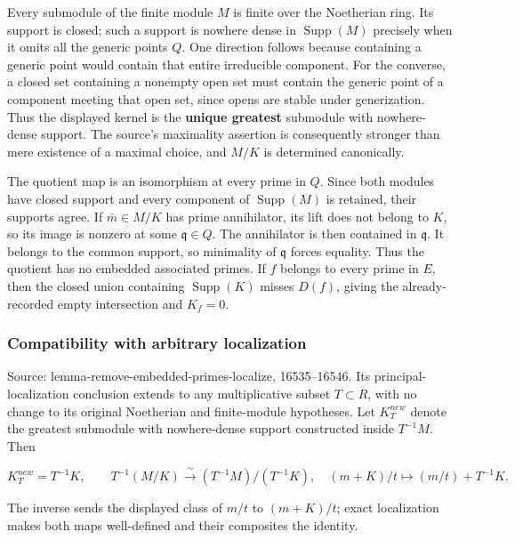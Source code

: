 Every submodule of the finite module \(M\) is finite over the Noetherian ring. Its support is closed; such a support is nowhere dense in \(\operatorname{Supp}(M)\) precisely when it omits all the generic points \(Q\). One direction follows because containing a generic point would contain that entire irreducible component. For the converse, a closed set containing a nonempty open set must contain the generic point of a component meeting that open set, since opens are stable under generization. Thus the displayed kernel is the \textbf{unique greatest} submodule with nowhere-dense support. The source's maximality assertion is consequently stronger than mere existence of a maximal choice, and \(M/K\) is determined canonically.

The quotient map is an isomorphism at every prime in \(Q\). Since both modules have closed support and every component of \(\operatorname{Supp}(M)\) is retained, their supports agree. If \(\bar m\in M/K\) has prime annihilator, its lift does not belong to \(K\), so its image is nonzero at some \(\mathfrak q\in Q\). The annihilator is then contained in \(\mathfrak q\). It belongs to the common support, so minimality of \(\mathfrak q\) forces equality. Thus the quotient has no embedded associated primes. If \(f\) belongs to every prime in \(E\), then the closed union containing \(\operatorname{Supp}(K)\) misses \(D(f)\), giving the already-recorded empty intersection and \(K_f=0\).

\subsubsection{Compatibility with arbitrary localization}\label{compatibility-with-arbitrary-localization}

Source: lemma-remove-embedded-primes-localize, 16535--16546. Its principal-localization conclusion extends to any multiplicative subset \(T\subset R\), with no change to its original Noetherian and finite-module hypotheses. Let \(K_T^{new}\) denote the greatest submodule with nowhere-dense support constructed inside \(T^{-1}M\). Then

\[
K_T^{new}=T^{-1}K,\qquad
T^{-1}(M/K)\xrightarrow{\;\sim\;}(T^{-1}M)/(T^{-1}K),
\quad (m+K)/t\longmapsto(m/t)+T^{-1}K.
\]

The inverse sends the displayed class of \(m/t\) to \((m+K)/t\); exact localization makes both maps well-defined and their composites the identity.

